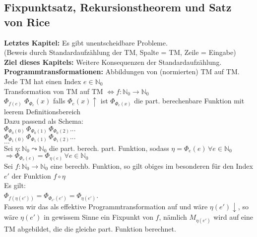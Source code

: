 
\subsection{Fixpunktsatz, Rekursionstheorem und Satz von Rice}
 
\textbf{Letztes Kapitel:} Es gibt unentscheidbare Probleme. \\
(Beweis durch Standardaufzählung der TM, Spalte = TM, Zeile = Eingabe) \\

\textbf{Ziel dieses Kapitels:} Weitere Konsequenzen der Standardaufzählung. \\

\textbf{Programmtransformationen:} Abbildungen von (normierten) TM auf TM. \\

Jede TM hat einen Index $e \in \mathbb{N}_0$ \\
Transformation von TM auf TM $\Leftrightarrow f: \mathbb{N}_0 \rightarrow \mathbb{N}_0$ \\
$\Phi_{f(e)}$
$\Phi_{\Phi_{e}}(x)$ falls $\Phi_e(x)\uparrow$ ist $\Phi_{\Phi_e(x)}$ die 
part. berechenbare Funktion mit leerem Definitionsbereich \\

Dazu passend als Schema: \\
$\Phi_{\Phi_0(0)} \, \Phi_{\Phi_0(1)} \, \Phi_{\Phi_0(2)}...$ \\
$\Phi_{\Phi_1(0)} \, \Phi_{\Phi_1(1)} \, \Phi_{\Phi_1(2)}...$ \\
$...$ \\

Sei $\eta : \mathbb{N}_0 \leadsto \mathbb{N}_0$ die part. berech. part. Funktion, sodass 
$\eta = \Phi_e(e) \, \forall e \in \mathbb{N}_0$ \\
$\Rightarrow \Phi_{\Phi_e(e)} = \Phi_{\eta(e)} \, \forall e \in \mathbb{N}_0$ \\

Sei $f: \mathbb{N}_0 \rightarrow \mathbb{N}_0$ eine berechb. Funktion, so gilt obiges im besonderen für den Index $e'$
der Funktion $f \circ \eta$ \\

Es gilt: \\
$\Phi_{f(\eta(e'))} = \Phi_{\Phi_{e'}(e')} = \Phi_{\eta(e')}$. \\

Fassen wir das als effektive Programmtransformation auf und wäre $\eta(e')\downarrow$, so wäre $\eta(e')$ in
gewissem Sinne ein Fixpunkt von $f$, nämlich $M_{\eta(e')}$ wird auf eine TM abgebildet, die die gleiche part. Funktion berechnet.

